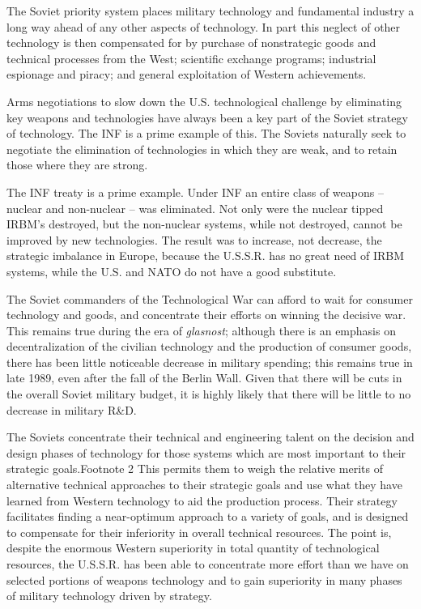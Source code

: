 The Soviet priority system places military technology and fundamental industry a long way ahead of any other aspects of technology. In part this neglect of other technology is then compensated for by purchase of nonstrategic goods and technical processes from the West; scientific exchange programs; industrial espionage and piracy; and general exploitation of Western achievements.

Arms negotiations to slow down the U.S. technological challenge by eliminating key weapons and technologies have always been a key part of the Soviet strategy of technology. The INF is a prime example of this. The Soviets naturally seek to negotiate the elimination of technologies in which they are weak, and to retain those where they are strong.

The INF treaty is a prime example. Under INF an entire class of weapons -- nuclear and non-nuclear -- was eliminated. Not only were the nuclear tipped IRBM's destroyed, but the non-nuclear systems, while not destroyed, cannot be improved by new technologies. The result was to increase, not decrease, the strategic imbalance in Europe, because the U.S.S.R. has no great need of IRBM systems, while the U.S. and NATO do not have a good substitute.

The Soviet commanders of the Technological War can afford to wait for consumer technology and goods, and concentrate their efforts on winning the decisive war. This remains true during the era of \textit{glasnost}; although there is an emphasis on decentralization of the civilian technology and the production of consumer goods, there has been little noticeable decrease in military spending; this remains true in late 1989, even after the fall of the Berlin Wall. Given that there will be cuts in the overall Soviet military budget, it is highly likely that there will be little to no decrease in military R\&D.

The Soviets concentrate their technical and engineering talent on the decision and design phases of technology for those systems which are most important to their strategic goals.Footnote 2 This permits them to weigh the relative merits of alternative technical approaches to their strategic goals and use what they have learned from Western technology to aid the production process. Their strategy facilitates finding a near-optimum approach to a variety of goals, and is designed to compensate for their inferiority in overall technical resources. The point is, despite the enormous Western superiority in total quantity of technological resources, the U.S.S.R. has been able to concentrate more effort than we have on selected portions of weapons technology and to gain superiority in many phases of military technology driven by strategy.

